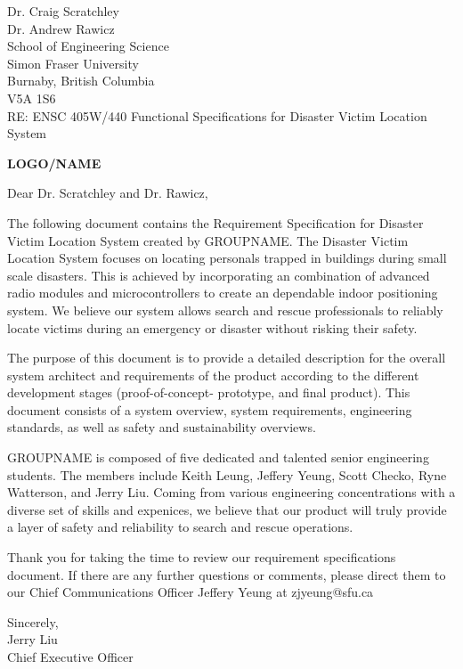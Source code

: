 \documentclass[11pt]{letter}
\date{June 09, 2019}
\begin{document}
\begin{letter}{
Dr. Craig Scratchley\\
Dr. Andrew Rawicz\\
School of Engineering Science\\
Simon Fraser University\\
Burnaby, British Columbia\\
V5A 1S6\\
\bigskip
RE: ENSC 405W/440 Functional Specifications for Disaster Victim Location System\\
} 


\begin{center}
\Huge\bf LOGO/NAME
\bigskip
\end{center} 


\opening{Dear Dr. Scratchley and Dr. Rawicz,} 
 
The following document contains the Requirement Specification for Disaster Victim Location System created by GROUPNAME. The Disaster Victim Location System focuses on locating personals trapped in buildings during small scale disasters. This is achieved by incorporating an combination of advanced radio modules and microcontrollers to create an dependable indoor positioning system. We believe our system allows search and rescue professionals to reliably locate victims during an emergency or disaster without risking their safety.

The purpose of this document is to provide a detailed description for the overall system architect and requirements of the product according to the different development stages (proof-of-concept- prototype, and final product). This document consists of a system overview, system requirements, engineering standards, as well as safety and sustainability overviews.

GROUPNAME is composed of five dedicated and talented senior engineering students. The members include Keith Leung, Jeffery Yeung, Scott Checko, Ryne Watterson, and Jerry Liu. Coming
from various engineering concentrations with a diverse set of skills and expenices, we believe that our product will truly provide a layer of safety and reliability to search and rescue operations.

Thank you for taking the time to review our requirement specifications document. If there are any further questions or comments, please direct them to our Chief Communications Officer Jeffery Yeung at zjyeung@sfu.ca

Sincerely,\\
Jerry Liu\\
Chief Executive Officer\\


\end{letter}
\end{document}
